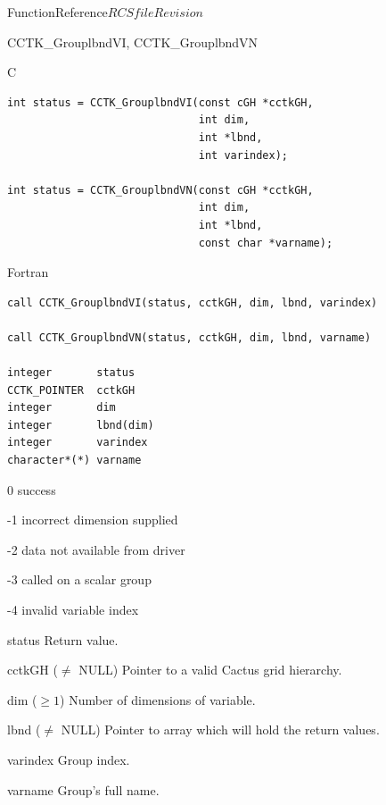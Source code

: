 \begin{cactuspart}{FunctionReference}{$RCSfile$}{$Revision$}
\begin{FunctionDescription}{CCTK\_GrouplbndVI, CCTK\_GrouplbndVN}
\begin{SynopsisSection}
\begin{Synopsis}{C}
\begin{verbatim}
int status = CCTK_GrouplbndVI(const cGH *cctkGH,
                              int dim,
                              int *lbnd,
                              int varindex);

int status = CCTK_GrouplbndVN(const cGH *cctkGH,
                              int dim,
                              int *lbnd,
                              const char *varname);
\end{verbatim}
\end{Synopsis}
\begin{Synopsis}{Fortran}
\begin{verbatim}
call CCTK_GrouplbndVI(status, cctkGH, dim, lbnd, varindex)

call CCTK_GrouplbndVN(status, cctkGH, dim, lbnd, varname)

integer       status
CCTK_POINTER  cctkGH
integer       dim
integer       lbnd(dim)
integer       varindex
character*(*) varname
\end{verbatim}
\end{Synopsis}
\end{SynopsisSection}

\begin{ResultSection}
\begin{Result}{\rm 0} success \end{Result}
\begin{Result}{\rm -1} incorrect dimension supplied \end{Result}
\begin{Result}{\rm -2} data not available from driver \end{Result}
\begin{Result}{\rm -3} called on a scalar group \end{Result}
\begin{Result}{\rm -4} invalid variable index \end{Result}
\end{ResultSection}

\begin{ParameterSection}
\begin{Parameter}{status} Return value. \end{Parameter}
\begin{Parameter}{cctkGH ($\ne$ NULL)} Pointer to a valid Cactus grid hierarchy. \end{Parameter}
\begin{Parameter}{dim ($\ge 1$)} Number of dimensions of variable. \end{Parameter}
\begin{Parameter}{lbnd ($\ne$ NULL)} Pointer to array which will hold the return values. \end{Parameter}
\begin{Parameter}{varindex} Group index. \end{Parameter}
\begin{Parameter}{varname} Group's full name. \end{Parameter}
\end{ParameterSection}


\end{FunctionDescription}
\end{cactuspart}
